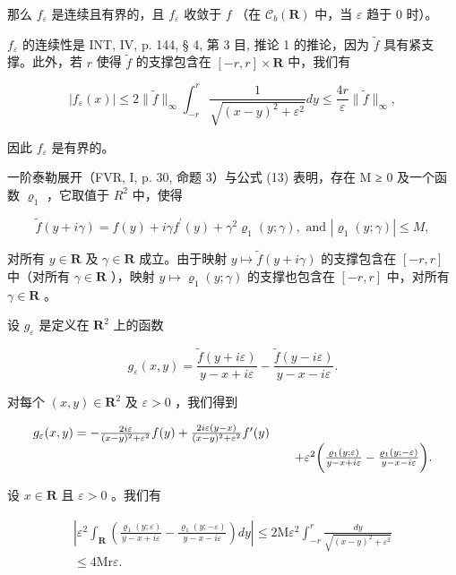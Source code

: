 那么 \(f_{\varepsilon}\) 是连续且有界的，且 \(f_{\varepsilon}\) 收敛于 \(f\) （在 \(\mathcal{C}_b(\mathbf{R})\) 中，当 \(\varepsilon\) 趋于 0 时）。

\(f_{\varepsilon}\) 的连续性是 INT, IV, p. 144, § 4, 第 3 目, 推论 1 的推论，因为 \(\widetilde{f}\) 具有紧支撑。此外，若 \(r\) 使得 \(\widetilde{f}\) 的支撑包含在 \([-r, r] \times \mathbf{R}\) 中，我们有

\[
| f _ {\varepsilon} (x) | \leqslant 2 \| \widetilde {f} \| _ {\infty} \int_ {- r} ^ {r} \frac {1}{\sqrt {(x - y) ^ {2} + \varepsilon^ {2}}} d y \leqslant \frac {4 r}{\varepsilon} \| \widetilde {f} \| _ {\infty},
\]

因此 \(f_{\varepsilon}\) 是有界的。

一阶泰勒展开（FVR, I, p. 30, 命题 3）与公式 (13) 表明，存在 M ≥ 0 及一个函数 \(\varrho_{1}\) ，它取值于 \(R^{2}\) 中，使得

\[
\widetilde {f} (y + i \gamma) = f (y) + i \gamma f ^ {\prime} (y) + \gamma^ {2} \varrho_ {1} (y; \gamma), \text {   and   } | \varrho_ {1} (y; \gamma) | \leqslant M,
\]

对所有 \(y \in \mathbf{R}\) 及 \(\gamma \in \mathbf{R}\) 成立。由于映射 \(y \mapsto \widetilde{f}(y + i\gamma)\) 的支撑包含在 \([-r, r]\) 中（对所有 \(\gamma \in \mathbf{R}\) ），映射 \(y \mapsto \varrho_{1}(y; \gamma)\) 的支撑也包含在 \([-r, r]\) 中，对所有 \(\gamma \in \mathbf{R}\) 。

设 \(g_{\varepsilon}\) 是定义在 \(\mathbf{R}^2\) 上的函数

\[
g _ {\varepsilon} (x, y) = \frac {\widetilde {f} (y + i \varepsilon)}{y - x + i \varepsilon} - \frac {\widetilde {f} (y - i \varepsilon)}{y - x - i \varepsilon}.
\]

对每个 \((x,y)\in \mathbf{R}^2\) 及 \(\varepsilon >0\) ，我们得到

\[
\begin{array}{r l} g _ {\varepsilon} (x, y) = - \frac {2 i \varepsilon}{(x - y) ^ {2} + \varepsilon^ {2}} f (y) + \frac {2 i \varepsilon (y - x)}{(x - y) ^ {2} + \varepsilon^ {2}} f ^ {\prime} (y) \\ & \quad + \varepsilon^ {2} \bigg (\frac {\varrho_ {1} (y ; \varepsilon)}{y - x + i \varepsilon} - \frac {\varrho_ {1} (y ; - \varepsilon)}{y - x - i \varepsilon} \bigg). \end{array}
\]

设 \(x \in \mathbf{R}\) 且 \(\varepsilon > 0\) 。我们有

\[
\begin{array}{c} \left| \varepsilon^ {2} \int_ {\mathbf {R}} \left(\frac {\varrho_ {1} (y ; \varepsilon)}{y - x + i \varepsilon} - \frac {\varrho_ {1} (y ; - \varepsilon)}{y - x - i \varepsilon}\right) d y \right| \leqslant 2 \mathrm{M} \varepsilon^ {2} \int_ {- r} ^ {r} \frac {d y}{\sqrt {(x - y) ^ {2} + \varepsilon^ {2}}} \\ \leqslant 4 \mathrm{Mr} \varepsilon . \end{array}
\]

